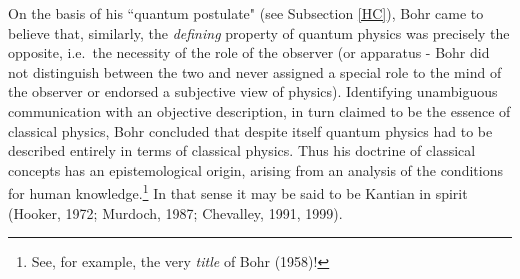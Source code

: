 \documentclass[12pt,titlepage]{article}
\begin{document}
 On the basis of his ``quantum postulate" (see Subsection \ref{HC}), Bohr came to believe that, similarly, the 
 \textit{defining} property of quantum physics was precisely the opposite, i.e.\ the necessity of the role of the observer (or apparatus - Bohr did not distinguish between the two and  never assigned a special role to the mind of the observer or endorsed a subjective view of physics). Identifying unambiguous communication with an objective description, in turn claimed to be the essence of classical physics, 
 Bohr concluded that despite itself quantum physics had to be described entirely in terms of classical physics. Thus his doctrine of classical concepts
has an epistemological origin, arising from an analysis of the conditions for human knowledge.\footnote{See, for example, the very {\it title} of Bohr (1958)!} In that sense it may be said to be Kantian in spirit (Hooker, 1972; Murdoch, 1987; Chevalley, 1991, 1999). 
\end{document}
